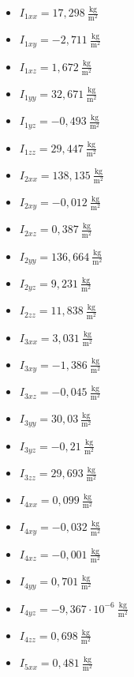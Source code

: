 \begin{itemize}
	\item $I_{1xx} = 17,298~\frac{\text{kg}}{\text{m}^2}$
	\item $I_{1xy} = -2,711~\frac{\text{kg}}{\text{m}^2}$
	\item $I_{1xz} = 1,672~\frac{\text{kg}}{\text{m}^2}$
	\item $I_{1yy} = 32,671~\frac{\text{kg}}{\text{m}^2}$
	\item $I_{1yz} = -0,493~\frac{\text{kg}}{\text{m}^2}$
	\item $I_{1zz} = 29,447~\frac{\text{kg}}{\text{m}^2}$
	\\
	\item $I_{2xx} = 138,135~\frac{\text{kg}}{\text{m}^2}$
	\item $I_{2xy} = -0,012~\frac{\text{kg}}{\text{m}^2}$
	\item $I_{2xz} = 0,387~\frac{\text{kg}}{\text{m}^2}$
	\item $I_{2yy} = 136,664~\frac{\text{kg}}{\text{m}^2}$
	\item $I_{2yz} = 9,231~\frac{\text{kg}}{\text{m}^2}$
	\item $I_{2zz} = 11,838~\frac{\text{kg}}{\text{m}^2}$
	\\
	\item $I_{3xx} = 3,031~\frac{\text{kg}}{\text{m}^2}$
	\item $I_{3xy} = -1,386~\frac{\text{kg}}{\text{m}^2}$
	\item $I_{3xz} = -0,045~\frac{\text{kg}}{\text{m}^2}$
	\item $I_{3yy} = 30,03~\frac{\text{kg}}{\text{m}^2}$
	\item $I_{3yz} = -0,21~\frac{\text{kg}}{\text{m}^2}$
	\item $I_{3zz} = 29,693~\frac{\text{kg}}{\text{m}^2}$
	\\
	\item $I_{4xx} = 0,099~\frac{\text{kg}}{\text{m}^2}$
	\item $I_{4xy} = -0,032~\frac{\text{kg}}{\text{m}^2}$
	\item $I_{4xz} = -0,001~\frac{\text{kg}}{\text{m}^2}$
	\item $I_{4yy} = 0,701~\frac{\text{kg}}{\text{m}^2}$
	\item $I_{4yz} = -9,367\cdot10^{-6}~\frac{\text{kg}}{\text{m}^2}$
	\item $I_{4zz} = 0,698~\frac{\text{kg}}{\text{m}^2}$
	\\
	\item $I_{5xx} = 0,481~\frac{\text{kg}}{\text{m}^2}$

\end{itemize}
